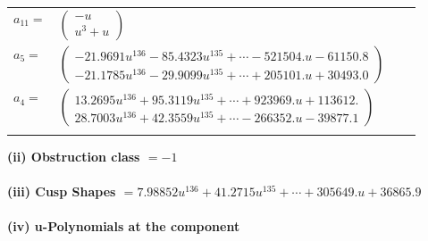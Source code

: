 \documentclass[1p]{elsarticle_modified}
\theoremstyle{definition}
\begin{document}
\begin{tabular}{m{7pt} m{180pt} m{7pt} m{180pt} }
\flushright $a_{11}=$&$\begin{pmatrix}- u\\u^3+u\end{pmatrix}$ \\
\flushright $a_{5}=$&$\begin{pmatrix}-21.9691 u^{136}-85.4323 u^{135}+\cdots-521504. u-61150.8\\-21.1785 u^{136}-29.9099 u^{135}+\cdots+205101. u+30493.0\end{pmatrix}$ \\
\flushright $a_{4}=$&$\begin{pmatrix}13.2695 u^{136}+95.3119 u^{135}+\cdots+923969. u+113612.\\28.7003 u^{136}+42.3559 u^{135}+\cdots-266352. u-39877.1\end{pmatrix}$\\&\end{tabular}
\flushleft \textbf{(ii) Obstruction class $= -1$}\\~\\
\flushleft \textbf{(iii) Cusp Shapes $= 7.98852 u^{136}+41.2715 u^{135}+\cdots+305649. u+36865.9$}\\~\\
\newpage\renewcommand{\arraystretch}{1}
\flushleft \textbf{(iv) u-Polynomials at the component}\newline \\
\end{document}
